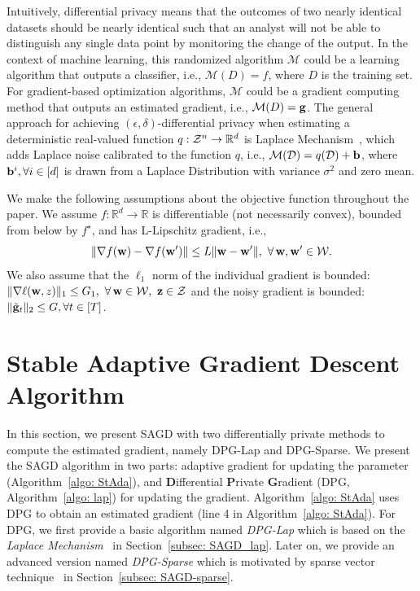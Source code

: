 \documentclass[11pt]{article}
\begin{document}
Intuitively, differential privacy means that the outcomes of two nearly identical  datasets should be nearly identical such that an analyst will not be able to distinguish any single data point by monitoring the change of the output. In the context of machine learning, this randomized algorithm $\mathcal{M}$ could be a learning algorithm that outputs a classifier, i.e., $\mathcal{M}(D)=f$, where $D$ is the training set. For gradient-based optimization algorithms, $\mathcal{M}$ could be a gradient computing method that outputs an estimated gradient, i.e., $\mathcal{M}(D)=\mathbf{g}$. 
The general approach for achieving  $(\epsilon, \delta)$-differential privacy when estimating a deterministic real-valued function $q: \cZ^n \rightarrow \mathbb{R}^d$ is Laplace Mechanism~\citep{dwro2014}, which adds Laplace noise calibrated to the function $q$, i.e., $\mathcal{M}(\cD)= q(\cD)+ \b$, where $\mathbf{b}^i, \forall i \in [d]$ is drawn from a Laplace Distribution with variance $\sigma^2$ and zero mean.

We make the following assumptions about the objective function throughout the paper. 
We assume $ f: \mathbb{R}^d \rightarrow \mathbb{R}$ is differentiable (not necessarily convex), bounded from below by $f^\star$,  and has L-Lipschitz gradient, i.e.,
	\begin{equation}
	\nr \|\nabla f(\w) -\nabla f(\w^\prime) \|\leq L \|\w-\w^\prime \|, ~ \forall\, \w, \w^\prime \in \cW.
	\end{equation}
We also assume that the $\ell_1$ norm of the individual gradient is bounded: $\|\nabla \ell (\w, z) \|_1 \leq G_1, \ \forall\,\w \in \cW, \  \z \in \cZ$ and the noisy gradient is bounded: $\|\tilde {\mathbf{g}}_t\|_2 \leq G, \forall t \in [T]$.




\section{Stable Adaptive Gradient Descent Algorithm}
\label{algorithm}

In this section, we present \textsc{SAGD} with two differentially private methods to compute the estimated gradient, namely DPG-Lap and DPG-Sparse.
We present the \textsc{SAGD} algorithm in two parts: adaptive gradient for updating the parameter (Algorithm~\ref{algo: StAda}), and \textbf{D}ifferential \textbf{P}rivate\textbf{ G}radient (DPG, Algorithm~\ref{algo: lap}) for updating the gradient. Algorithm~\ref{algo: StAda} uses 
DPG to obtain an estimated gradient (line 4 in Algorithm~\ref{algo: StAda}). For DPG, we first provide a basic algorithm named \emph{DPG-Lap} which is based on the \emph{Laplace Mechanism}~\citep{dwro2014} in Section~\ref{subsec: SAGD_lap}. Later on, we provide an advanced version named \emph{DPG-Sparse} which is motivated by sparse vector technique~\citep{dwro2014} in Section~\ref{subsec: SAGD-sparse}.
\end{document}
